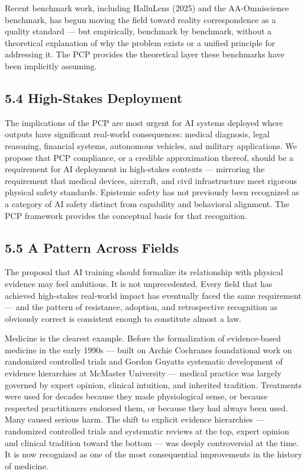 \documentclass[
]{article}
\begin{document}
Recent benchmark work, including HalluLens (2025) and the AA-Omniscience
benchmark, has begun moving the field toward reality correspondence as a
quality standard --- but empirically, benchmark by benchmark, without a
theoretical explanation of why the problem exists or a unified principle
for addressing it. The PCP provides the theoretical layer these
benchmarks have been implicitly assuming.

\subsection{5.4 High-Stakes Deployment}\label{high-stakes-deployment}

The implications of the PCP are most urgent for AI systems deployed
where outputs have significant real-world consequences: medical
diagnosis, legal reasoning, financial systems, autonomous vehicles, and
military applications. We propose that PCP compliance, or a credible
approximation thereof, should be a requirement for AI deployment in
high-stakes contexts --- mirroring the requirement that medical devices,
aircraft, and civil infrastructure meet rigorous physical safety
standards. Epistemic safety has not previously been recognized as a
category of AI safety distinct from capability and behavioral alignment.
The PCP framework provides the conceptual basis for that recognition.

\subsection{5.5 A Pattern Across Fields}\label{a-pattern-across-fields}

The proposal that AI training should formalize its relationship with
physical evidence may feel ambitious. It is not unprecedented. Every
field that has achieved high-stakes real-world impact has eventually
faced the same requirement --- and the pattern of resistance, adoption,
and retrospective recognition as obviously correct is consistent enough
to constitute almost a law.

Medicine is the clearest example. Before the formalization of
evidence-based medicine in the early 1990s --- built on Archie
Cochrane\textquotesingle s foundational work on randomized controlled
trials and Gordon Guyatt\textquotesingle s systematic development of
evidence hierarchies at McMaster University --- medical practice was
largely governed by expert opinion, clinical intuition, and inherited
tradition. Treatments were used for decades because they made
physiological sense, or because respected practitioners endorsed them,
or because they had always been used. Many caused serious harm. The
shift to explicit evidence hierarchies --- randomized controlled trials
and systematic reviews at the top, expert opinion and clinical tradition
toward the bottom --- was deeply controversial at the time. It is now
recognized as one of the most consequential improvements in the history
of medicine.
\end{document}
